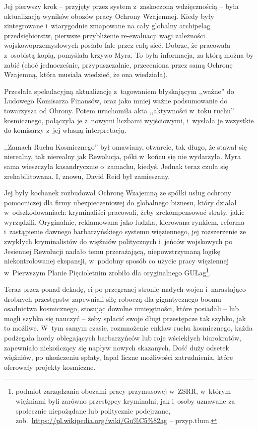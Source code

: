 \documentclass[oneside,polish,11pt,sfheadings]{mwbk}
\begin{document}
Jej pierwszy krok -- przyjęty przez system z~zaskoczoną wdzięcznością -- była aktualizacją wyników obozów pracy Ochrony Wzajemnej. Kiedy były
zintegrowane i~wiarygodnie zmapowane na cały globalny archipelag
przedsiębiorstw, pierwsze przybliżenie re-ewaluacji wagi zależności
wojskowo\dywiz przemysłowych posłało fale przez całą sieć. Dobrze, że
pracowała z~osobistą kopią, pomyślała krzywo Myra. To była informacja,
za którą można by zabić (choć jednocześnie, przypuszczalnie, przeceniona
przez samą Ochronę Wzajemną, która musiała wiedzieć, że ona wiedziała).

Przesłała spekulacyjną aktualizację z~tagowaniem błyskającym ,,ważne''
do Ludowego Komisarza Finansów, oraz jako mniej ważne podsumowanie do
towarzysza od Obrony. Potem uruchomiła akta ,,aktywności w~toku ruchu''
kosmicznego, połączyła je z~nowymi liczbami wyjściowymi, i~wysłała je
wszystkie do komisarzy z~jej własną interpretacją.

,,Zamach Ruchu Kosmicznego'' był omawiany, otwarcie, tak długo, że
stawał się nierealny, tak nierealny jak Rewolucja, póki w~końcu się nie
wydarzyła. Myra sama wieszczyła kasandrycznie o~zamachu, kiedyś. Jednak
teraz czuła się zrehabilitowana. I, znowu, David Reid był zamieszany.

Jej były kochanek rozbudował Ochronę Wzajemną ze spółki usług ochrony
pomocniczej dla firmy ubezpieczeniowej do globalnego biznesu, który
działał w~odszkodowaniach: kryminaliści pracowali, żeby zrekompensować
straty, jakie wyrządzili. Oryginalnie, reklamowana jako ludzka,
kierowana rynkiem, reforma i~zastąpienie dawnego barbarzyńskiego systemu
więziennego, jej rozszerzenie ze zwykłych kryminalistów do więźniów
politycznych i~jeńców wojskowych po Jesiennej Rewolucji nadało temu
przerażającą, niepowstrzymaną logikę niekontrolowanej ekspansji, w~podobny sposób co użycie pracy więziennej w~Pierwszym Planie
Pięcioletnim zrobiło dla oryginalnego GUŁag\footnote{ podmiot zarządzania
obozami pracy przymusowej w~ZSRR, w~którym więźniami byli zarówno
przestępcy kryminalni, jak i~osoby uznawane za społecznie niepożądane
lub politycznie podejrzane,
zob.~\url{https://pl.wikipedia.org/wiki/Gu\%C5\%82ag} -- przyp.tłum.}.

Teraz przez ponad dekadę, ci po przegranej stronie małych wojen i~narastająco drobnych przestępstw zapewniali siłę roboczą dla
gigantycznego boomu osadnictwa kosmicznego, stosując dowolne
umiejętności, które posiadali -- lub mogli szybko się nauczyć -- żeby
spłacić swoje długi przestępcze tak szybko, jak to możliwe. W~tym samym
czasie, rozmnożenie enklaw ruchu kosmicznego, każda podżegała hordy
oblegających barbarzyńców lub roje wściekłych biurokratów, zapewniało
niekończący się napływ nowych skazanych. Dość duży odsetek więźniów, po
ukończeniu spłaty, łapał liczne możliwości zatrudnienia, które oferowały
projekty kosmiczne.
\end{document}
